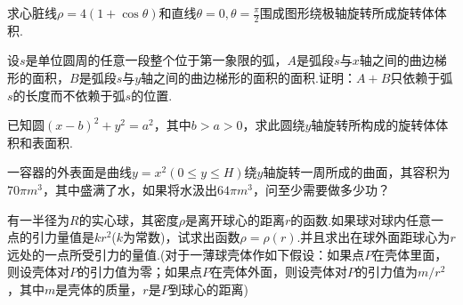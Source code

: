 \begin{xiti}
\item 求心脏线$\rho=4(1+\cos \theta)$和直线$\theta=0, \theta=\frac{\pi}{2}$围成图形绕极轴旋转所成旋转体体积.
\item  设$s$是单位圆周的任意一段整个位于第一象限的弧，$A$是弧段$s$与$x$轴之间的曲边梯形的面积，$B$是弧段$s$与$y$轴之间的曲边梯形的面积的面积.证明：$A+B$只依赖于弧$s$的长度而不依赖于弧$s$的位置.

\item 已知圆$(x-b)^{2}+y^{2}=a^{2}$，其中$b>a>0$，求此圆绕$y$轴旋转所构成的旋转体体积和表面积.

\item 一容器的外表面是曲线$y=x^{2}(0 \leqslant y \leqslant H)$绕$y$轴旋转一周所成的曲面，其容积为$70\pi m^{3}$，其中盛满了水，如果将水汲出$64\pi m^{3}$，问至少需要做多少功？

\item 有一半径为$R$的实心球，其密度$\rho$是离开球心的距离$r$的函数.如果球对球内任意一点的引力量值是$kr^{2}$($k$为常数)，试求出函数$\rho=\rho(r)$.并且求出在球外面距球心为$r$远处的一点所受引力的量值.(对于一薄球壳体作如下假设：如果点$P$在壳体里面，则设壳体对$P$的引力值为零；如果点$P$在壳体外面，则设壳体对$P$的引力值为$m/r^{2}$，其中$m$是壳体的质量，$r$是$P$到球心的距离)
\end{xiti}

